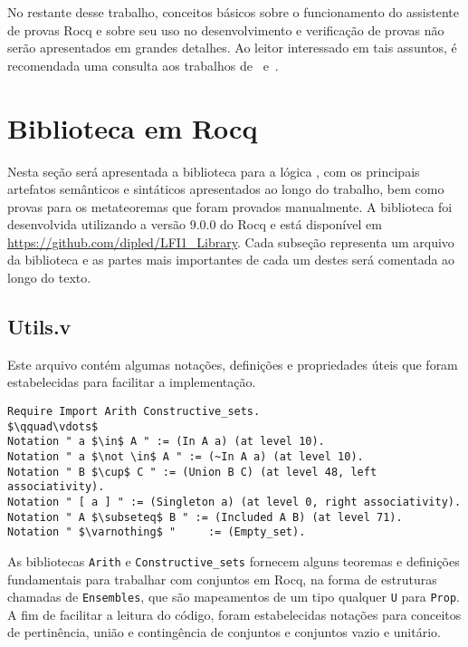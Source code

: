     No restante desse trabalho, conceitos básicos sobre o funcionamento do assistente de provas Rocq e sobre seu uso no desenvolvimento e verificação de provas não serão apresentados em grandes detalhes. Ao leitor interessado em tais assuntos, é recomendada uma consulta aos trabalhos de~ e~.

\section{Biblioteca em Rocq}\label{sec:biblioteca}
    Nesta seção será apresentada a biblioteca para a lógica \lfium{}, com os principais artefatos semânticos e sintáticos apresentados ao longo do trabalho, bem como provas para os metateoremas que foram provados manualmente. A biblioteca foi desenvolvida utilizando a versão 9.0.0 do Rocq e está disponível em \url{https://github.com/dipled/LFI1_Library}. Cada subseção representa um arquivo da biblioteca e as partes mais importantes de cada um destes será comentada ao longo do texto.

    \subsection{Utils.v}\label{sec:utils}

      Este arquivo contém algumas notações, definições e propriedades úteis que foram estabelecidas para facilitar a implementação.

      \begin{lstlisting}[name=Utils, frame=single, language=coq]
Require Import Arith Constructive_sets.
$\qquad\vdots$
Notation " a $\in$ A " := (In A a) (at level 10).
Notation " a $\not \in$ A " := (~In A a) (at level 10).
Notation " B $\cup$ C " := (Union B C) (at level 48, left associativity).
Notation " [ a ] " := (Singleton a) (at level 0, right associativity).
Notation " A $\subseteq$ B " := (Included A B) (at level 71). 
Notation " $\varnothing$ "     := (Empty_set).
      \end{lstlisting}

      As bibliotecas \texttt{Arith} e \texttt{Constructive\_sets} fornecem alguns teoremas e definições fundamentais para trabalhar com conjuntos em Rocq, na forma de estruturas chamadas de \texttt{Ensembles}, que são mapeamentos de um tipo qualquer \texttt{U} para \texttt{Prop}. A fim de facilitar a leitura do código, foram estabelecidas notações para conceitos de pertinência, união e contingência de conjuntos e conjuntos vazio e unitário.

